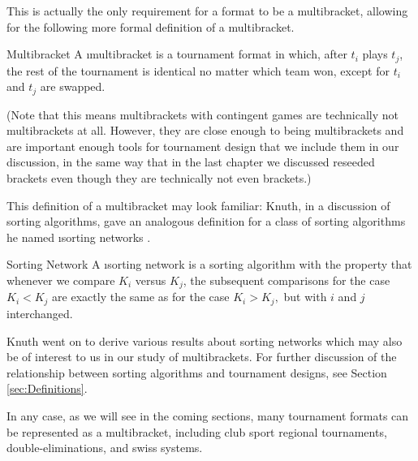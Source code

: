{    This is actually the only requirement for a format to be a multibracket, allowing for the following more formal definition of a multibracket.

    \begin{definition}{Multibracket}{}
        A \i{multibracket} is a tournament format in which, after $t_i$ plays $t_j$, the rest of the tournament is identical no matter which team won, except for $t_i$ and $t_j$ are swapped.
    \end{definition}

    (Note that this means multibrackets with contingent games are technically not multibrackets at all. However, they are close enough to being multibrackets and are important enough tools for tournament design that we include them in our discussion, in the same way that  in the last chapter we discussed reseeded brackets even though they are technically not even brackets.)

    This definition of a multibracket may look familiar: Knuth, in a discussion of sorting algorithms, gave an analogous definition for a class of sorting algorithms he named \i{sorting networks} \cite{knuth}.

    \begin{definition}{Sorting Network}{}
        A \i{sorting network} is a sorting algorithm with the property that whenever we compare $K_i$ versus $K_j$, the subsequent comparisons for the case  $K_i < K_j$ are exactly the same as for the case $K_i > K_j,$ but with $i$ and $j$ interchanged.
    \end{definition}

    Knuth went on to derive various results about sorting networks which may also be of interest to us in our study of multibrackets. For further discussion of the relationship between sorting algorithms and tournament designs, see Section \ref{sec:Definitions}. %
        
    In any case, as we will see in the coming sections, many tournament formats can be represented as a multibracket, including club sport regional tournaments, double-eliminations, and swiss systems.
}







